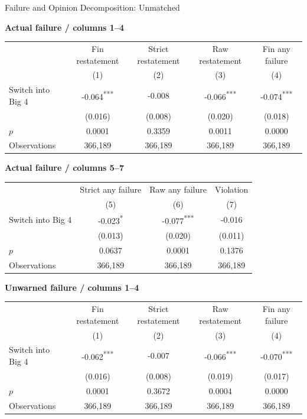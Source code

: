 \documentclass[10pt]{article}
\newcommand{\sym}[1]{\textsuperscript{#1}}
\begin{document}
\fontsize{10}{12}\selectfont
\setlength{\tabcolsep}{3pt}\renewcommand{\arraystretch}{1.15}
\begin{center}\large Failure and Opinion Decomposition: Unmatched\end{center}
\medskip\textbf{Actual failure / columns 1--4}\par\smallskip
\begin{tabular*}{\textwidth}{@{\extracolsep{\fill}}lcccc@{}}
\toprule
 & Fin restatement & Strict restatement & Raw restatement & Fin any failure \\
 & (1) & (2) & (3) & (4) \\
\midrule
Switch into Big 4 & -0.064\sym{***} & -0.008 & -0.066\sym{***} & -0.074\sym{***} \\
 & (0.016) & (0.008) & (0.020) & (0.018) \\
$p$ & 0.0001 & 0.3359 & 0.0011 & 0.0000 \\
Observations & 366,189 & 366,189 & 366,189 & 366,189 \\
\bottomrule\end{tabular*}\par
\medskip\textbf{Actual failure / columns 5--7}\par\smallskip
\begin{tabular*}{\textwidth}{@{\extracolsep{\fill}}lccc@{}}
\toprule
 & Strict any failure & Raw any failure & Violation \\
 & (5) & (6) & (7) \\
\midrule
Switch into Big 4 & -0.023\sym{*} & -0.077\sym{***} & -0.016 \\
 & (0.013) & (0.020) & (0.011) \\
$p$ & 0.0637 & 0.0001 & 0.1376 \\
Observations & 366,189 & 366,189 & 366,189 \\
\bottomrule\end{tabular*}\par
\medskip\textbf{Unwarned failure / columns 1--4}\par\smallskip
\begin{tabular*}{\textwidth}{@{\extracolsep{\fill}}lcccc@{}}
\toprule
 & Fin restatement & Strict restatement & Raw restatement & Fin any failure \\
 & (1) & (2) & (3) & (4) \\
\midrule
Switch into Big 4 & -0.062\sym{***} & -0.007 & -0.066\sym{***} & -0.070\sym{***} \\
 & (0.016) & (0.008) & (0.019) & (0.017) \\
$p$ & 0.0001 & 0.3672 & 0.0004 & 0.0000 \\
Observations & 366,189 & 366,189 & 366,189 & 366,189 \\
\bottomrule\end{tabular*}\par
\end{document}
